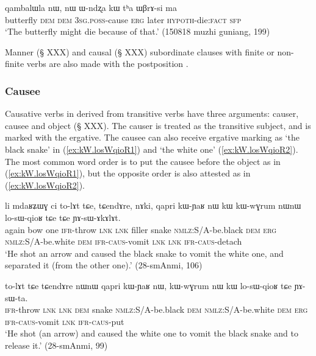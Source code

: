 \begin{exe}
\ex \label{ex:nW.Wndzxa.kW}
 \gll   qambalɯla nɯ, nɯ ɯ-ndʐa kɯ tʰa ɯβrɤ-si ma \\
 butterfly \textsc{dem} \textsc{dem} \textsc{3sg}.\textsc{poss}-cause \textsc{erg}  later \textsc{hypoth}-die:\textsc{fact} \textsc{sfp} \\
 \glt `The butterfly might die because of that.' (150818 muzhi guniang, 199)
\end{exe}

Manner (§ XXX) and causal (§ XXX) subordinate clauses with finite or non-finite verbs are also made with the postposition .

\subsubsection{Causee} \label{sec:causee.kW}
Causative verbs in  derived from transitive verbs have three arguments: causer, causee and object (§ XXX). The causer is treated as the transitive subject, and is marked with the ergative. The causee can also receive  ergative marking as  `the black snake' in (\ref{ex:kW.losWqioR1}) and  `the white one' (\ref{ex:kW.losWqioR2}). The most common word order is to put the causee before the object as in (\ref{ex:kW.losWqioR1}), but the opposite order is also attested as in (\ref{ex:kW.losWqioR2}).

\begin{exe}
\ex \label{ex:kW.losWqioR1}
 \gll   li mdaʁʑɯɣ ci to-lɤt tɕe, tɕendɤre, nɤki, qapri kɯ-ɲaʁ nɯ kɯ kɯ-wɣrum nɯnɯ lo-sɯ-qioʁ tɕe tɕe ɲɤ-sɯ-ɤkɤlɤt. \\
 again bow one \textsc{ifr}-throw \textsc{lnk} \textsc{lnk} filler snake \textsc{nmlz}:S/A-be.black \textsc{dem} \textsc{erg} \textsc{nmlz}:S/A-be.white \textsc{dem} \textsc{ifr}-\textsc{caus}-vomit \textsc{lnk} \textsc{lnk} \textsc{ifr}-\textsc{caus}-detach \\
 \glt `He shot an arrow and caused the black snake to vomit the white one, and separated it (from the other one).' (28-smAnmi, 106)
\end{exe}

\begin{exe}
\ex \label{ex:kW.losWqioR2}
 \gll  to-lɤt tɕe tɕendɤre nɯnɯ qapri kɯ-ɲaʁ nɯ, kɯ-wɣrum nɯ kɯ lo-sɯ-qioʁ tɕe ɲɤ-sɯ-ta. \\
  \textsc{ifr}-throw \textsc{lnk} \textsc{lnk} \textsc{dem} snake \textsc{nmlz}:S/A-be.black \textsc{dem}  \textsc{nmlz}:S/A-be.white \textsc{dem} \textsc{erg} \textsc{ifr}-\textsc{caus}-vomit \textsc{lnk} \textsc{ifr}-\textsc{caus}-put \\
  \glt `He shot (an arrow) and caused the white one to vomit the black snake and to release it.' (28-smAnmi, 99)
\end{exe}

